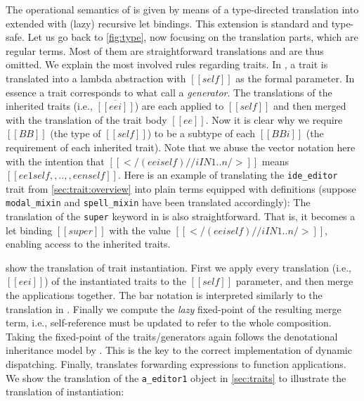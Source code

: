The operational semantics of \sedel is given by means of a type-directed
translation into \fnamee extended with (lazy) recursive let bindings.
This extension is standard and type-safe. Let us go back to
\cref{fig:type}, now focusing on the translation parts, which
are regular \fnamee terms. Most of them
are straightforward translations and are thus omitted. We explain the most
involved rules regarding traits. In , a trait is translated into
a lambda abstraction with $[[self]]$ as the formal parameter.
In essence a trait corresponds to what \citet{cook1989denotational} call a \emph{generator}.
 The translations
of the inherited traits (i.e., $\overline{[[eei]]}$) are each applied to
$[[self]]$ and then merged with the translation of the trait body $[[ee]]$. Now
it is clear why we require $[[BB]]$ (the type of $[[self]]$) to be a subtype of each
$[[BBi]]$ (the requirement of each inherited trait). Note that we abuse the vector
notation here with the intention that $[[</ (eei self) // i IN 1..n />]]$ means
$[[ee1 self ,, .. ,, een self]]$.
Here is an example of translating the \lstinline{ide_editor} trait from \cref{sec:trait:overview} into
plain \fnamee terms equipped with definitions (suppose \lstinline{modal_mixin} and \lstinline{spell_mixin}
have been translated accordingly):
The translation of the \lstinline{super} keyword in  is also straightforward. That is, it becomes a let binding
$[[super]]$ with the value $[[</ (eei self) // i IN 1..n />]]$, enabling access to the inherited traits.

 show the translation of trait instantiation.
First we apply every translation (i.e., $[[eei]]$) of the instantiated traits to the $[[self]]$ parameter,
and then merge the applications together. The bar notation is
interpreted similarly to the translation in . Finally we compute the \emph{lazy}
fixed-point of the resulting merge term, i.e., self-reference must be updated to refer to
the whole composition. Taking the fixed-point of the
traits/generators again follows the denotational inheritance model by \citet{cook1989denotational}.
 This is the key to the correct implementation of dynamic
 dispatching. Finally,
 translates forwarding expressions to function
applications. We show the translation of the
\lstinline{a_editor1} object in \cref{sec:traits} to illustrate the
translation of instantiation:

